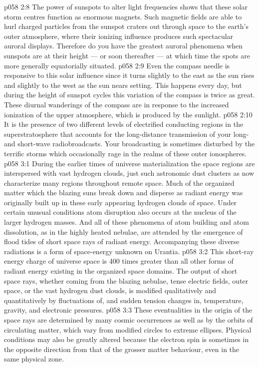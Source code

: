 \vs p058 2:8 The power of sunspots to alter light frequencies shows that these solar storm centres function as enormous magnets. Such magnetic fields are able to hurl charged particles from the sunspot craters out through space to the earth’s outer atmosphere, where their ionizing influence produces such spectacular auroral displays. Therefore do you have the greatest auroral phenomena when sunspots are at their height --- or soon thereafter --- at which time the spots are more generally equatorially situated.
\vs p058 2:9 Even the compass needle is responsive to this solar influence since it turns slightly to the east as the sun rises and slightly to the west as the sun nears setting. This happens every day, but during the height of sunspot cycles this variation of the compass is twice as great. These diurnal wanderings of the compass are in response to the increased ionization of the upper atmosphere, which is produced by the sunlight.
\vs p058 2:10 It is the presence of two different levels of electrified conducting regions in the superstratosphere that accounts for the long\hyp{}distance transmission of your long\hyp{} and short\hyp{}wave radiobroadcasts. Your broadcasting is sometimes disturbed by the terrific storms which occasionally rage in the realms of these outer ionospheres.
\vs p058 3:1 During the earlier times of universe materialization the space regions are interspersed with vast hydrogen clouds, just such astronomic dust clusters as now characterize many regions throughout remote space. Much of the organized matter which the blazing suns break down and disperse as radiant energy was originally built up in these early appearing hydrogen clouds of space. Under certain unusual conditions atom disruption also occurs at the nucleus of the larger hydrogen masses. And all of these phenomena of atom building and atom dissolution, as in the highly heated nebulae, are attended by the emergence of flood tides of short space rays of radiant energy. Accompanying these diverse radiations is a form of space\hyp{}energy unknown on Urantia.
\vs p058 3:2 This short\hyp{}ray energy charge of universe space is 400 times greater than all other forms of radiant energy existing in the organized space domains. The output of short space rays, whether coming from the blazing nebulae, tense electric fields, outer space, or the vast hydrogen dust clouds, is modified qualitatively and quantitatively by fluctuations of, and sudden tension changes in, temperature, gravity, and electronic pressures.
\vs p058 3:3 These eventualities in the origin of the space rays are determined by many cosmic occurrences as well as by the orbits of circulating matter, which vary from modified circles to extreme ellipses. Physical conditions may also be greatly altered because the electron spin is sometimes in the opposite direction from that of the grosser matter behaviour, even in the same physical zone.
